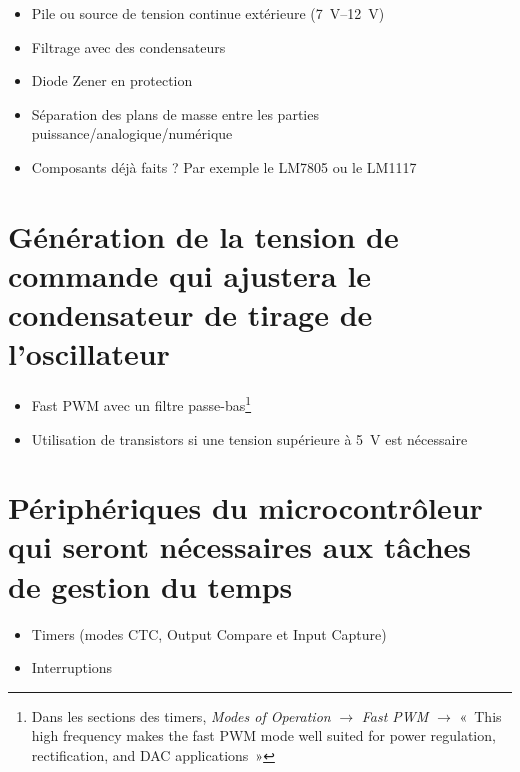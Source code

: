\documentclass[12pt, a4paper]{article}
\begin{document}
\begin{itemize}
	\item Pile ou source de tension continue extérieure (\qtyrange{7}{12}{\volt})
	\item Filtrage avec des condensateurs
	\item Diode Zener en protection
	\item Séparation des plans de masse entre les parties puissance/analogique/numérique
	\item Composants déjà faits ? Par exemple le LM7805 ou le LM1117
\end{itemize}

\section{Génération de la tension de commande qui ajustera le condensateur de tirage de l'oscillateur}

\begin{itemize}
	\item Fast PWM avec un filtre passe-bas\footnote{Dans les sections des timers, \textit{Modes of Operation} $\rightarrow$ \textit{Fast PWM} $\rightarrow$ «~This high frequency makes the fast PWM mode well suited for power regulation, rectification, and DAC applications~»}
	\item Utilisation de transistors si une tension supérieure à \SI{5}{\volt} est nécessaire
\end{itemize}

\section{Périphériques du microcontrôleur qui seront nécessaires aux tâches de gestion du temps}

\begin{itemize}
	\item Timers (modes CTC, Output Compare et Input Capture)
	\item Interruptions
\end{itemize}
\end{document}
